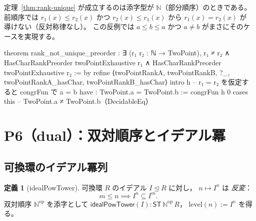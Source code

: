 \documentclass[a4paper,11pt]{ltjsarticle}
\theoremstyle{definition}
\newtheorem{definition}{定義}[section]
\theoremstyle{plain}
\theoremstyle{remark}
\newcommand{\ST}{\mathsf{ST}}    %
\newcommand{\lev}{\mathrm{level}}
\newcommand{\op}{\mathrm{op}}
\begin{document}
\begin{mathinsight}
定理~\ref{thm:rank-unique} が成立するのは添字型が
$\mathbb{N}$（部分順序）のときである。
前順序では $r_1(x) \leq r_2(x)$ かつ $r_2(x) \leq r_1(x)$ から
$r_1(x) = r_2(x)$ が導けない（反対称律なし）。
この反例では $a \leq b \leq a$ かつ $a \neq b$ がまさにそのケースを実現する。
\end{mathinsight}

\begin{leancode}[caption={rank 非一意性の証明（P5: counterexample）}]
theorem rank_not_unique_preorder :
    ∃ (r₁ r₂ : ℕ → TwoPoint), r₁ ≠ r₂ ∧
      HasCharRankPreorder twoPointExhaustive r₁ ∧
      HasCharRankPreorder twoPointExhaustive r₂ := by
  refine ⟨twoPointRankA, twoPointRankB, ?_,
          twoPointRankA_hasChar, twoPointRankB_hasChar⟩
  intro h
  -- r₁ = r₂ を仮定すると congrFun で a = b
  have : TwoPoint.a = TwoPoint.b := congrFun h 0
  cases this   -- TwoPoint.a ≠ TwoPoint.b（DecidableEq）
\end{leancode}

\section{P6（dual）：双対順序とイデアル冪}\label{sec:ideal}

\subsection{可換環のイデアル冪列}

\begin{definition}[idealPowTower]\label{def:ideal-pow}
可換環 $R$ のイデアル $I \trianglelefteq R$ に対し，
$n \mapsto I^n$ は \emph{反変}：
\[
  m \leq n \implies I^n \subseteq I^m.
\]
双対順序 $\mathbb{N}^{\op}$ を添字として
$\mathsf{idealPowTower}(I) : \ST\,\mathbb{N}^{\op}\,R$，
$\lev(n) := I^n$ を得る。
\end{definition}
\end{document}
